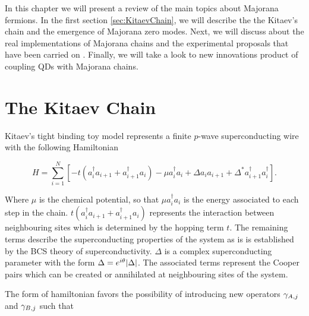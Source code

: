 In this chapter we will present a review of the main topics about Majorana fermions. In the first section \ref{sec:KitaevChain}, we will describe the the Kitaev's chain and the emergence of Majorana zero modes. Next, we will discuss about the real implementations of Majorana chains and the experimental proposals that have been carried on . Finally, we will take a look to new innovations product of coupling QDs with Majorana chains. 



\section{The Kitaev Chain \label{sec:KitaevChain}}
Kitaev's tight binding toy model  represents a  finite $p$-wave superconducting wire with the following Hamiltonian

\begin{equation}
H = \sum_{i=1}^N \left[ -t(a_i^{\dagger} a_{i+1} + a_{i+1}^{\dagger}a_i) -\mu a_i^{\dagger} a_{i} +  \Delta a_{i}a_{i+1} + \Delta^* a_{i+1}^{\dagger}a_i^{\dagger} \right].  \label{eq:kitaevHam}
\end{equation}

Where $\mu$ is the chemical potential, so that $\mu a_i^{\dagger} a_{i}$ is the energy associated to each step in the chain. $t(a_i^{\dagger} a_{i+1} + a_{i+1}^{\dagger}a_i)$ represents the interaction between neighbouring sites which is determined by the hopping term $t$. The remaining terms describe the superconducting properties of the system as is is established by the BCS theory of superconductivity. $\Delta$ is a complex superconducting parameter with the form  $\Delta = e^{i\theta} \vert \Delta \vert$. The associated terms represent the Cooper pairs which can be created or annihilated at neighbouring sites of the system.

The form of hamiltonian  favors the possibility of introducing new operators $\gamma_{A,j}$ and $\gamma_{B,j}$ such that

